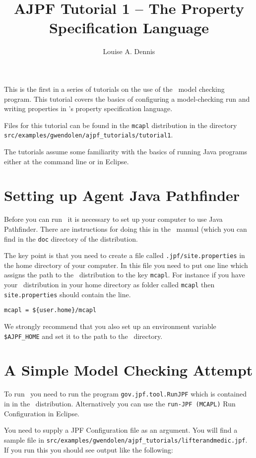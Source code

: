 \documentclass[a4]{article}
\author{Louise A. Dennis}
\title{AJPF Tutorial 1 -- The Property Specification Language}
\begin{document}
\maketitle
This is the first in a series of tutorials on the use of the \ajpf\ model checking program.  This tutorial covers the basics of configuring a model-checking run and writing properties in \ajpf's property specification language.

Files for this tutorial can be found in the \texttt{mcapl} distribution in the directory \texttt{src/examples/gwendolen/ajpf\_tutorials/tutorial1}.

The tutorials assume some familiarity with the basics of running Java programs either at the command line or in Eclipse.

\section{Setting up Agent Java Pathfinder}
Before you can run \ajpf\ it is necessary to set up your computer to use Java Pathfinder.  There are instructions for doing this in the \mcapl\ manual (which you can find in the \texttt{doc} directory of the distribution.

The key point is that you need to create a file called \texttt{.jpf/site.properties} in the home directory of your computer.  In this file you need to put one line which assigns the path to the \mcapl\ distribution to the key \texttt{mcapl}.  For instance if you have your \mcapl\ distribution in your home directory as  folder called \texttt{mcapl} then \texttt{site.properties} should contain the line.

\begin{verbatim}
mcapl = ${user.home}/mcapl
\end{verbatim}

We strongly recommend that you also set up an environment variable \texttt{\$AJPF\_HOME} and set it to the path to the \mcapl\ directory.

\section{A Simple Model Checking Attempt}

To run \ajpf\ you need to run the program \texttt{gov.jpf.tool.RunJPF} which is contained in  in the \mcapl\ distribution.  Alternatively you can use the \texttt{run-JPF (MCAPL)} Run Configuration in Eclipse.

You need to supply a JPF Configuration file as an argument.  You will find a sample file in \texttt{src/examples/gwendolen/ajpf\_tutorials/lifterandmedic.jpf}.  If you run this you should see output like the following:
\end{document}

